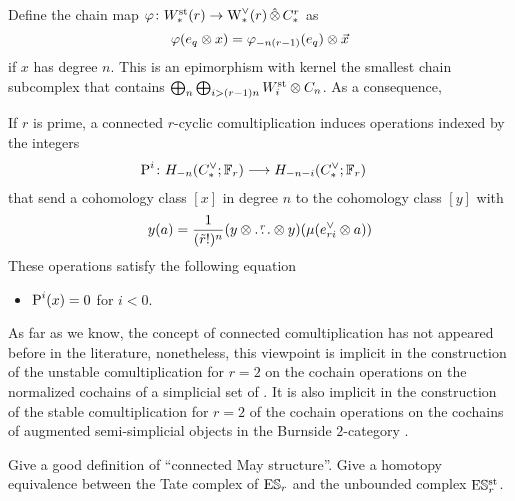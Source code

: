 Define the chain map $\varphi \colon  \Wst(r)\to \rWd(r)\hotimes \rucadenas$ as
\[
	\varphi(e_q \ot  x) = \varphi_{-n(r-1)}(e_{q}) \ot  \vec{x}
\]
if $x$ has degree $n$. This is an epimorphism with kernel the smallest chain subcomplex that contains $\bigoplus_n\bigoplus_{i>(r-1)n} \Wst[i] \ot  \ucadenas[n]$. As a consequence,



\begin{proposition}
	If $r$ is prime, a connected $r$-cyclic comultiplication induces operations indexed by the integers
	\begin{align*}
		\power^{i} \colon  H_{-n}(\ucocadenas;\mathbb{F}_r)&\lra H_{-n-i}(\ucocadenas;\mathbb{F}_r)
	\end{align*}
	that send a cohomology class $[x]$ in degree $n$ to the cohomology class $[y]$ with
	\[
	y(a) = \frac{1}{(\tilde{r}!)^n}(y \ot  \overset{r}{\ldots} \ot  y)(\mu(e_{ri}^\vee \ot  a))
	\]
	These operations satisfy the following equation
	\begin{itemize}
		\item $\power^i(x) = 0$ for $i<0$.
	\end{itemize}
\end{proposition}

\begin{example}
As far as we know, the concept of connected comultiplication has not appeared before in the literature, nonetheless, this viewpoint is implicit in the construction of the unstable comultiplication for $r=2$ on the cochain operations on the normalized cochains of a simplicial set of \cite{medina2021fast_sq}. It is also implicit in the construction of the stable comultiplication for $r=2$ of the cochain operations on the cochains of augmented semi-simplicial objects in the Burnside $2$-category \cite{cantero-moran2020khovanov}.
\end{example}

\begin{question}
	Give a good definition of ``connected May structure''. Give a homotopy equivalence between the Tate complex of $\ES_r$ and the unbounded complex $\ESst_r$.
\end{question}

